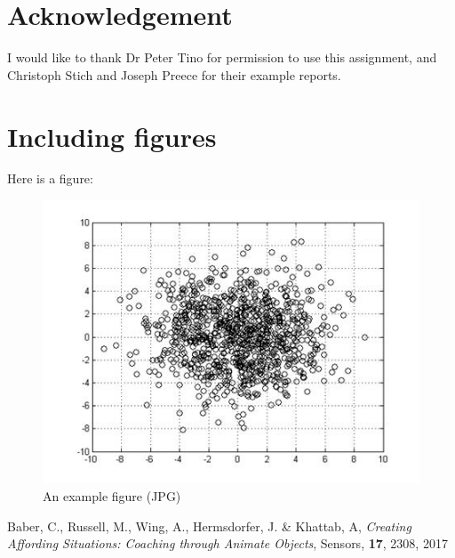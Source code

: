 \documentclass[preprint,12pt]{elsarticle}
\begin{document}
\section{Acknowledgement}
\label{s:acknowledge}
I would like to thank Dr Peter Tino for permission to use this assignment, and Christoph Stich and Joseph Preece for their example reports.

\section{Including figures}
\label{s:another-section}
Here is a figure:
\begin{figure}[ht]
    \centerline{\includegraphics[scale=0.8]{figs/clus1.jpg}}
    \caption{An example figure (JPG)}
\end{figure}






%



\begin{thebibliography}{00}


 Baber, C., Russell, M., Wing, A., Hermsdorfer, J. \& Khattab, A, {\em Creating Affording Situations: Coaching through Animate Objects}, Sensors, {\bf 17}, 2308, 2017

\end{thebibliography}
\end{document}
